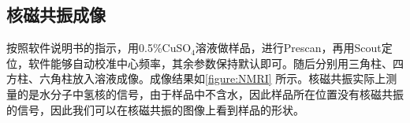 \documentclass[font=default]{mpltx}
\begin{document}
\subsection{核磁共振成像}
按照软件说明书的指示，用0.5\%CuSO$_4$溶液做样品，进行Prescan，再用Scout定位，软件能够自动校准中心频率，其余参数保持默认即可。随后分别用三角柱、四方柱、六角柱放入溶液成像。成像结果如\autoref{figure:NMRI} 所示。核磁共振实际上测量的是水分子中氢核的信号，由于样品中不含水，因此样品所在位置没有核磁共振的信号，因此我们可以在核磁共振的图像上看到样品的形状。

\begin{figure}[]
  \centering 
\end{figure}
\end{document}
